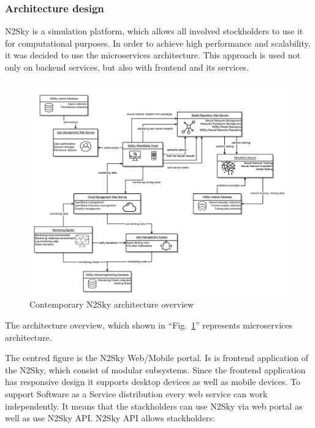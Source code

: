 \subsubsection{Architecture design}

N2Sky is a simulation platform, which allows all involved stockholders to use it for computational purposes. In order to achieve high performance and scalability, it was decided to use the microservices architecture. This approach is used not only on backend services, but also with frontend and its services. 

\begin{figure}[htbp]
\begin{center}
  \includegraphics[width=\linewidth]{components/2/new_arch.png}
  \caption{Contemporary N2Sky architecture overview}
  \label{fig:newarch}
\end{center}
\end{figure}

The architecture overview, which shown in ``Fig.~\ref{fig:newarch}'' represents microservices architecture. 

The centred figure is the N2Sky Web/Mobile portal. Is is frontend application of the N2Sky, which consist of modular subsystems. Since the frontend application has responsive design it supports desktop devices as well as mobile devices. 
To support Software as a Service distribution every web service can work independently. It means that the stackholders can use N2Sky via web portal as well as use N2Sky API.
N2Sky API allows  stackholders:

